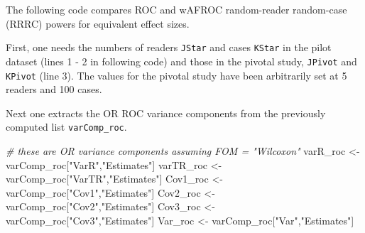 \documentclass[
]{book}
\newenvironment{Shaded}{\begin{snugshade}}{\end{snugshade}}
\newcommand{\CommentTok}[1]{\textcolor[rgb]{0.56,0.35,0.01}{\textit{#1}}}
\newcommand{\DecValTok}[1]{\textcolor[rgb]{0.00,0.00,0.81}{#1}}
\newcommand{\FunctionTok}[1]{\textcolor[rgb]{0.00,0.00,0.00}{#1}}
\newcommand{\NormalTok}[1]{#1}
\newcommand{\OtherTok}[1]{\textcolor[rgb]{0.56,0.35,0.01}{#1}}
\newcommand{\SpecialCharTok}[1]{\textcolor[rgb]{0.00,0.00,0.00}{#1}}
\newcommand{\StringTok}[1]{\textcolor[rgb]{0.31,0.60,0.02}{#1}}
\begin{document}
The following code compares ROC and wAFROC random-reader random-case (RRRC) powers for equivalent effect sizes.

First, one needs the numbers of readers \texttt{JStar} and cases \texttt{KStar} in the pilot dataset (lines 1 - 2 in following code) and those in the pivotal study, \texttt{JPivot} and \texttt{KPivot} (line 3). The values for the pivotal study have been arbitrarily set at 5 readers and 100 cases.

\begin{Shaded}
\end{Shaded}

Next one extracts the OR ROC variance components from the previously computed list \texttt{varComp\_roc}.

\begin{Shaded}
\begin{Highlighting}[numbers=left,,]
\CommentTok{\# these are OR variance components assuming FOM = "Wilcoxon"}
\NormalTok{varR\_roc }\OtherTok{\textless{}{-}}\NormalTok{ varComp\_roc[}\StringTok{"VarR"}\NormalTok{,}\StringTok{"Estimates"}\NormalTok{]}
\NormalTok{varTR\_roc }\OtherTok{\textless{}{-}}\NormalTok{ varComp\_roc[}\StringTok{"VarTR"}\NormalTok{,}\StringTok{"Estimates"}\NormalTok{]}
\NormalTok{Cov1\_roc }\OtherTok{\textless{}{-}}\NormalTok{ varComp\_roc[}\StringTok{"Cov1"}\NormalTok{,}\StringTok{"Estimates"}\NormalTok{]}
\NormalTok{Cov2\_roc }\OtherTok{\textless{}{-}}\NormalTok{ varComp\_roc[}\StringTok{"Cov2"}\NormalTok{,}\StringTok{"Estimates"}\NormalTok{]}
\NormalTok{Cov3\_roc }\OtherTok{\textless{}{-}}\NormalTok{ varComp\_roc[}\StringTok{"Cov3"}\NormalTok{,}\StringTok{"Estimates"}\NormalTok{]}
\NormalTok{Var\_roc }\OtherTok{\textless{}{-}}\NormalTok{ varComp\_roc[}\StringTok{"Var"}\NormalTok{,}\StringTok{"Estimates"}\NormalTok{]}
\end{Highlighting}
\end{Shaded}
\end{document}
